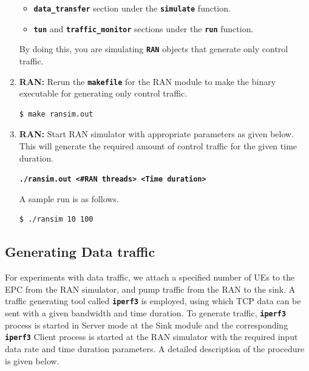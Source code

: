 \pdfminorversion=4\documentclass[hidelinks]{report}
\newcommand{\cf}[1] {
	\textbf{\texttt{#1}}
}
\begin{document}
\begin{enumerate}
\begin{itemize}
\item \cf{data\_transfer} section under the \cf{simulate} function.

\item \cf{tun} and \cf{traffic\_monitor} sections under the \cf{run} function.

\end{itemize}

By doing this, you are simulating \cf{RAN} objects that generate only control traffic.

\item \textbf{RAN:} Rerun the \cf{makefile} for the RAN module to make the binary executable for generating only control traffic.

\begin{lstlisting}[language=bash]
$ make ransim.out
\end{lstlisting}

\item \textbf{RAN:} Start RAN simulator with appropriate parameters as given below. This will generate the required amount of control traffic for the given time duration.

\begin{center}

\cf{./ransim.out <\#RAN threads> <Time duration>}

\end{center}

A sample run is as follows.

\begin{lstlisting}[language=bash]
$ ./ransim 10 100
\end{lstlisting}

\end{enumerate}


\subsection*{Generating Data traffic}

For experiments with data traffic, we attach a specified number of UEs to the EPC from the RAN simulator, and pump traffic from the RAN to the sink. A traffic generating tool called \cf{iperf3} is employed, using which TCP data can be sent with a given bandwidth and time duration. To generate traffic, \cf{iperf3} process is started in Server mode at the Sink module and the corresponding \cf{iperf3} Client process is started at the RAN simulator with the required input data rate and time duration parameters. A detailed description of the procedure is given below.
\end{document}
